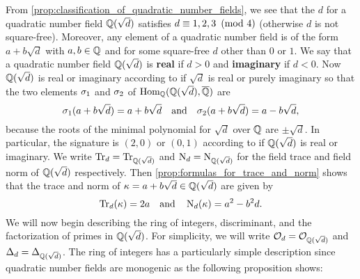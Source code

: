     From \cref{prop:classification_of_quadratic_number_fields}, we see that the $d$ for a quadratic number field $\mathbb{Q}(\sqrt{d})$ satisfies $d \equiv 1,2,3 \ \left(\text{mod }4\right)$ (otherwise $d$ is not square-free). Moreover, any element of a quadratic number field is of the form $a+b\sqrt{d}$ with $a,b \in \mathbb{Q}$ and for some square-free $d$ other than $0$ or $1$. We say that a quadratic number field $\mathbb{Q}(\sqrt{d})$ is \textbf{real} if $d > 0$ and \textbf{imaginary} if $d < 0$. Now $\mathbb{Q}(\sqrt{d})$ is real or imaginary according to if $\sqrt{d}$ is real or purely imaginary so that the two elements $\sigma_{1}$ and $\sigma_{2}$ of $\operatorname{\mathrm{Hom}}_{\mathbb{Q}}(\mathbb{Q}(\sqrt{d}),\overline{\mathbb{Q}})$ are
    \[
      \sigma_{1}(a+b\sqrt{d}) = a+b\sqrt{d} \quad \text{and} \quad \sigma_{2}(a+b\sqrt{d}) = a-b\sqrt{d},
    \]
    because the roots of the minimal polynomial for $\sqrt{d}$ over $\mathbb{Q}$ are $\pm\sqrt{d}$. In particular, the signature is $(2,0)$ or $(0,1)$ according to if $\mathbb{Q}(\sqrt{d})$ is real or imaginary. We write $\operatorname{\mathrm{Tr}}_{d} = \operatorname{\mathrm{Tr}}_{\mathbb{Q}(\sqrt{d})}$ and $\operatorname{\mathrm{N}}_{d} = \operatorname{\mathrm{N}}_{\mathbb{Q}(\sqrt{d})}$ for the field trace and field norm of $\mathbb{Q}(\sqrt{d})$ respectively. Then \cref{prop:formulas_for_trace_and_norm} shows that the trace and norm of $\kappa = a+b\sqrt{d} \in \mathbb{Q}(\sqrt{d})$ are given by
    \[
      \operatorname{\mathrm{Tr}}_{d}(\kappa) = 2a \quad \text{and} \quad \operatorname{\mathrm{N}}_{d}(\kappa) = a^{2}-b^{2}d.
    \]
    We will now begin describing the ring of integers, discriminant, and the factorization of primes in $\mathbb{Q}(\sqrt{d})$. For simplicity, we will write $\mathcal{O}_{d} = \mathcal{O}_{\mathbb{Q}(\sqrt{d})}$ and $\Delta_{d} = \Delta_{\mathbb{Q}(\sqrt{d})}$. The ring of integers has a particularly simple description since quadratic number fields are monogenic as the following proposition shows:
    
